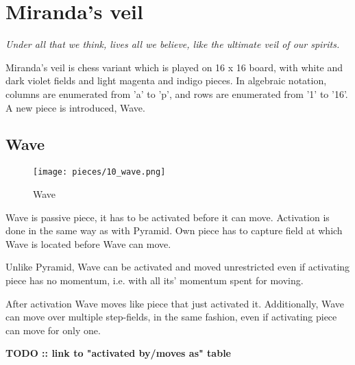 
\chapter*{Miranda's veil}

\begin{flushright}
\parbox{0.8\textwidth}{
\emph{Under all that we think, lives all we believe, like the ultimate veil of our spirits. \\
 } }
\end{flushright}

\noindent
Miranda's veil is chess variant which is played on 16 x 16 board, with
white and dark violet fields and light magenta and indigo pieces. In
algebraic notation, columns are enumerated from 'a' to 'p', and rows
are enumerated from '1' to '16'. A new piece is introduced, Wave.

\clearpage %

\section*{Wave}

\noindent
\begin{wrapfigure}[12]{l}{0.4\textwidth}
\texttt{[image: pieces/10\_wave.png]}
\caption{Wave}
\label{fig:10_wave}
\end{wrapfigure}
Wave is passive piece, it has to be activated before it can move.
Activation is done in the same way as with Pyramid. Own piece
has to capture field at which Wave is located before Wave can
move.

Unlike Pyramid, Wave can be activated and moved unrestricted even
if activating piece has no momentum, i.e. with all its' momentum
spent for moving.

After activation Wave moves like piece that just activated it.
Additionally, Wave can move over multiple step-fields, in the same
fashion, even if activating piece can move for only one.

\textbf{\huge{TODO :: link to "activated by/moves as" table}} %

